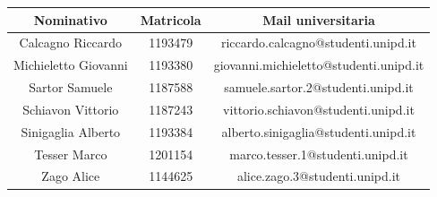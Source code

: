 \begin{center}
	\begin{longtable}{| c | c | c |}
		\hline
		\rowcolor[HTML]{F9CB9C} 
		\textbf{Nominativo} & \textbf{Matricola} & \textbf{Mail universitaria}  \\ \hline
		Calcagno Riccardo & 1193479   & riccardo.calcagno@studenti.unipd.it  \\ \hline
		Michieletto Giovanni &  1193380  & giovanni.michieletto@studenti.unipd.it  \\ \hline
		Sartor Samuele &  1187588  &  samuele.sartor.2@studenti.unipd.it \\ \hline
		Schiavon Vittorio & 1187243   & vittorio.schiavon@studenti.unipd.it  \\ \hline
		Sinigaglia Alberto &  1193384  & alberto.sinigaglia@studenti.unipd.it  \\ \hline 
		Tesser Marco &  1201154  & marco.tesser.1@studenti.unipd.it  \\ \hline
		Zago Alice &  1144625  &  alice.zago.3@studenti.unipd.it \\ \hline  

	\end{longtable}
\end{center}


